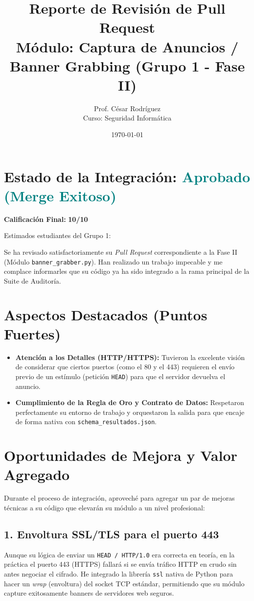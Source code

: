 \documentclass[12pt,a4paper]{article}
\title{Reporte de Revisión de Pull Request \\ \large Módulo: Captura de Anuncios / Banner Grabbing (Grupo 1 - Fase II)}
\author{Prof. César Rodríguez \\ \small Curso: Seguridad Informática}
\date{\today}
\begin{document}
\maketitle

\section*{Estado de la Integración: \textcolor{teal}{Aprobado (Merge Exitoso)}}

\noindent \textbf{Calificación Final:} \textbf{10/10}

\vspace{0.5cm}
Estimados estudiantes del Grupo 1:

Se ha revisado satisfactoriamente su \textit{Pull Request} correspondiente a la Fase II (Módulo \texttt{banner\_grabber.py}). Han realizado un trabajo impecable y me complace informarles que su código ya ha sido integrado a la rama principal de la Suite de Auditoría.

\section*{Aspectos Destacados (Puntos Fuertes)}

\begin{itemize}[label=$\bullet$]
    \item \textbf{Atención a los Detalles (HTTP/HTTPS):} Tuvieron la excelente visión de considerar que ciertos puertos (como el 80 y el 443) requieren el envío previo de un estímulo (petición \texttt{HEAD}) para que el servidor devuelva el anuncio.
    \item \textbf{Cumplimiento de la Regla de Oro y Contrato de Datos:} Respetaron perfectamente su entorno de trabajo y orquestaron la salida para que encaje de forma nativa con \texttt{schema\_resultados.json}.
\end{itemize}

\section*{Oportunidades de Mejora y Valor Agregado}

Durante el proceso de integración, aproveché para agregar un par de mejoras técnicas a su código que elevarán su módulo a un nivel profesional:

\subsection*{1. Envoltura SSL/TLS para el puerto 443}
Aunque su lógica de enviar un \texttt{HEAD / HTTP/1.0} era correcta en teoría, en la práctica el puerto 443 (HTTPS) fallará si se envía tráfico HTTP en crudo sin antes negociar el cifrado. He integrado la librería \texttt{ssl} nativa de Python para hacer un \textit{wrap} (envoltura) del socket TCP estándar, permitiendo que su módulo capture exitosamente banners de servidores web seguros.
\end{document}
